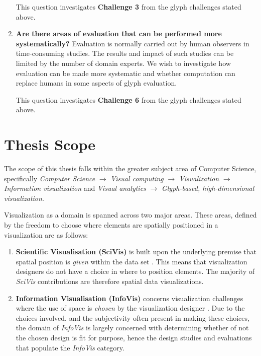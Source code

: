 \begin{enumerate}
This question investigates \textbf{Challenge 3} from the glyph challenges stated above.

\item \textbf{Are there areas of evaluation that can be performed more systematically?}
Evaluation is normally carried out by human observers in time-consuming studies.
The results and impact of such studies can be limited by the number of domain experts.
We wish to investigate how evaluation can be made more systematic and whether computation can replace humans in some aspects of glyph evaluation.

This question investigates \textbf{Challenge 6} from the glyph challenges stated above.

\end{enumerate}

\section{Thesis Scope}
The scope of this thesis falls within the greater subject area of Computer Science, specifically \emph{Computer Science} $\rightarrow$ \emph{Visual computing} $\rightarrow$ \emph{Visualization} $\rightarrow$ \emph{Information visualization} and \emph{Visual analytics} $\rightarrow$ \emph{Glyph-based, high-dimensional visualization}.


Visualization as a domain is spanned across two major areas.
These areas, defined by the freedom to choose where elements are spatially positioned in a visualization are as follows:

\begin{enumerate}
	\item \textbf{Scientific Visualisation (SciVis)} is built upon the underlying premise that spatial position is \emph{given} within the data set \cite{munzner2014visualization, telea2014data}.
	This means that visualization designers do not have a choice in where to position elements.
	The majority of \emph{SciVis} contributions are therefore spatial data visualizations.
	
	\item \textbf{Information Visualisation (InfoVis)} concerns visualization challenges where the use of space is \emph{chosen} by the visualization designer \cite{munzner2014visualization}.
	Due to the choices involved, and the subjectivity often present in making these choices, the domain of \emph{InfoVis} is largely concerned with determining whether of not the chosen design is fit for purpose, hence the design studies and evaluations that populate the \emph{InfoVis} category.  
\end{enumerate}

